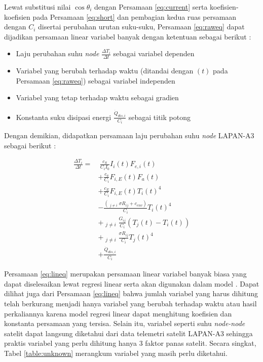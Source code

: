 Lewat substitusi nilai $\cos{\theta_i}$ dengan Persamaan \ref{eq:current} serta
koefisien-koefisien pada Persamaan \ref{eq:short} dan pembagian kedua ruas
persamaan dengan $C_i$ disertai perubahan urutan suku-suku,
Persamaan \ref{eq:raweq} dapat dijadikan persamaan linear variabel banyak
dengan ketentuan sebagai berikut :

\begin{itemize}
	\item Laju perubahan suhu \textit{node} $\frac{\Delta T_i}{\Delta t}$ sebagai variabel dependen
	\item Variabel yang berubah terhadap waktu (ditandai dengan $(t)$ pada Persamaan \ref{eq:raweq}) sebagai variabel independen
	\item Variabel yang tetap terhadap waktu sebagai gradien
	\item Konstanta suku disipasi energi $\frac{\dot{Q}_{dis,i}}{C_i}$ sebagai titik potong
\end{itemize}

Dengan demikian, didapatkan persamaan laju perubahan suhu \textit{node} LAPAN-A3 sebagai berikut :

\begin{equation}
\label{eq:lineq}
\begin{split}
	\frac{\Delta T_i}{\Delta t} = &\ \frac{c_S}{C_i I_0} I_{i}(t) F_{e,i}(t) \\
	&+ \frac{c_a}{C_i} F_{i,E}(t) F_a(t) \\
	&+ \frac{c_E}{C_i} F_{i,E}(t) T_{i}(t)^4 \\
	&- \frac{\left( \mathop{\sum_{j=1}^{N}}_{j \neq i} \sigma R_{ij} + c_{env} \right) }{C_i} T_{i}(t)^4 \\
	&+ \mathop{\sum_{j=1}^{N}}_{j \neq i} \frac{G_{ij}}{C_i} \left(T_j(t) - T_i(t)\right) \\
	&+ \mathop{\sum_{j=1}^{N}}_{j \neq i} \frac{\sigma R_{ij}}{C_i}T_{j}(t)^4 \\
	&+ \frac{\dot{Q}_{dis,i}}{C_i}
\end{split}
\end{equation}

Persamaan \ref{eq:lineq} merupakan persamaan linear variabel banyak biasa yang
dapat diselesaikan lewat regresi linear serta akan digunakan dalam model
. Dapat dilihat juga dari Persamaan \ref{eq:lineq} bahwa jumlah
variabel yang harus dihitung telah berkurang menjadi hanya variabel yang
berubah terhadap waktu atau hasil perkaliannya karena model regresi linear
dapat menghitung koefisien dan konstanta persamaan yang tersisa. Selain itu,
variabel seperti suhu \textit{node-node} satelit dapat langsung diketahui dari data
telemetri satelit LAPAN-A3 sehingga praktis variabel yang perlu dihitung hanya
3 faktor panas satelit. Secara singkat, Tabel \ref{table:unknown} merangkum
variabel yang masih perlu diketahui.

